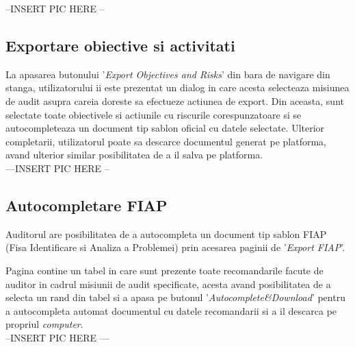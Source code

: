 --INSERT PIC HERE --

\subsection*{Exportare obiective si activitati}
La apasarea butonului '\textit{Export Objectives and Risks}' din bara de navigare din stanga, utilizatorului ii este prezentat un dialog in care acesta selecteaza misiunea de audit asupra careia doreste sa efectueze actiunea de export. Din aceasta, sunt selectate toate obiectivele si actiunile cu riscurile corespunzatoare si se autocompleteaza un document tip sablon oficial cu datele selectate. Ulterior completarii, utilizatorul poate sa descarce documentul generat pe platforma, avand ulterior similar posibilitatea de a il salva pe platforma. \\

---INSERT PIC HERE --

\subsection*{Autocompletare FIAP}
Auditorul are posibilitatea de a autocompleta un document tip sablon FIAP (Fisa Identificare si Analiza a Problemei) prin acesarea paginii de '\textit{Export FIAP}'.

Pagina contine un tabel in care sunt prezente toate recomandarile facute de auditor in cadrul misiunii de audit specificate, acesta avand posibilitatea de a selecta un rand din tabel si a apasa pe butonul '\textit{Autocomplete\&Download}' pentru a autocompleta automat documentul cu datele recomandarii si a il descarca pe propriul \textit{computer}.\\

--INSERT PIC HERE ---


 


